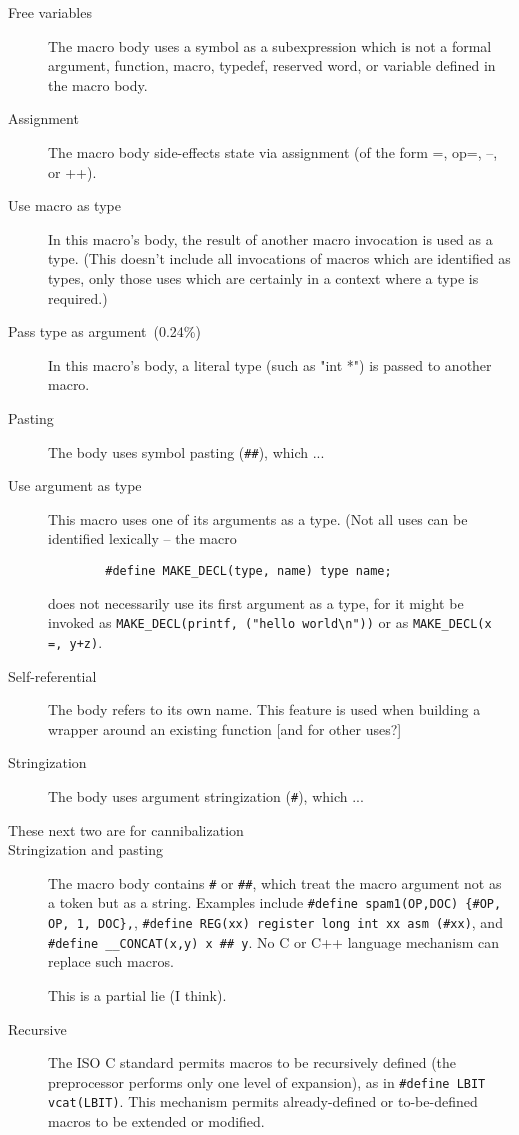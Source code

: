 \begin{description}
\item[Free variables]
  The macro body uses a symbol as a subexpression which is not a formal
  argument, function, macro, typedef, reserved word, or variable defined in
  the macro body.

\item[Assignment]
  The macro body side-effects state via assignment (of the form =, op=, --,
    or ++).

\item[Use macro as type]
  In this macro's body, the result of another macro invocation is used as a
  type.  (This doesn't include all invocations of macros which are
  identified as types, only those uses which are certainly in a context
  where a type is required.)

\item[Pass type as argument~(0.24\%)~]
  In this macro's body, a literal type (such as "int *") is passed to
  another macro.

\item[Pasting]
  The body uses symbol pasting ({\tt \#\#}), which ...

\item[Use argument as type]
  This macro uses one of its arguments as a type.  (Not all uses can be
  identified lexically -- the macro 
\begin{verbatim}
        #define MAKE_DECL(type, name) type name;
\end{verbatim}
  does not necessarily use its first argument as a type, for it might be
  invoked as {\tt \verb|MAKE_DECL|(printf, ("hello world\verb|\|n"))}  or as
  {\tt \verb|MAKE_DECL|(x =, y+z)}.

\item[Self-referential]
  The body refers to its own name.  This feature is used when building a
    wrapper around an existing function [and for other uses?]

\item[Stringization]
  The body uses argument stringization ({\tt \#}), which ...

\item[These next two are for cannibalization]

\item[Stringization and pasting]  The macro body contains {\tt \#} or
  {\tt \#\#}, which treat the macro argument not as a token but as a
  string.  Examples include {\tt \#define spam1(OP,DOC) \verb|{|\#OP, OP,
    1, DOC\verb|}|,}, {\tt \#define REG(xx) register long int xx asm
    (\#xx)}, and {\tt \#define \verb|__CONCAT|(x,y) x \#\# y}.  No C or C++
  language mechanism can replace such macros.

This is a partial lie (I think).
\item[Recursive]  The ISO C standard permits macros to be recursively
  defined (the preprocessor performs only one level of expansion), as in
  {\tt \#define LBIT vcat(LBIT)}.  This mechanism permits already-defined
  or to-be-defined macros to be extended or modified.
\end{description}

